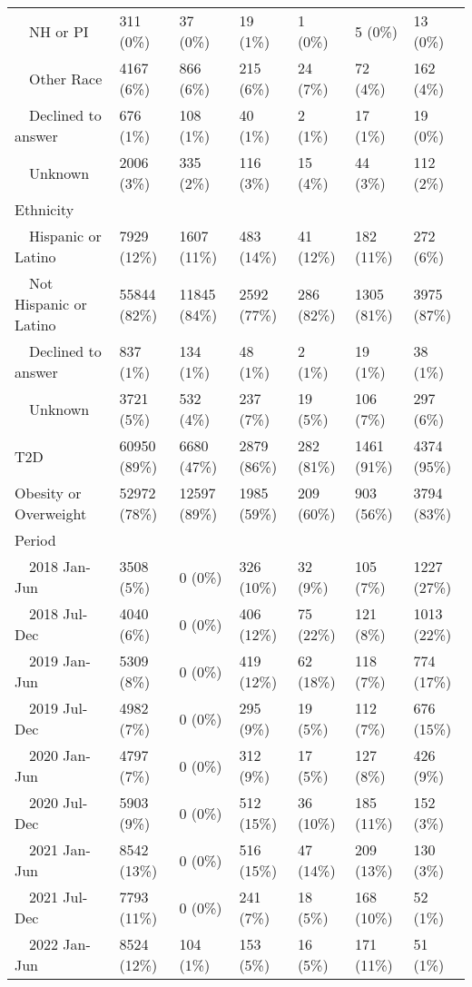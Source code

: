 \begin{longtable}{p{}p{}p{}p{}p{}p{}p{}}
    NH or PI & 311 (0\%) & 37 (0\%) & 19 (1\%) & 1 (0\%) & 5 (0\%) & 13 (0\%) \\ 
    Other Race & 4167 (6\%) & 866 (6\%) & 215 (6\%) & 24 (7\%) & 72 (4\%) & 162 (4\%) \\ 
    Declined to answer & 676 (1\%) & 108 (1\%) & 40 (1\%) & 2 (1\%) & 17 (1\%) & 19 (0\%) \\ 
    Unknown & 2006 (3\%) & 335 (2\%) & 116 (3\%) & 15 (4\%) & 44 (3\%) & 112 (2\%) \\ 
  Ethnicity &  &  &  &  &  &  \\ 
    Hispanic or Latino & 7929 (12\%) & 1607 (11\%) & 483 (14\%) & 41 (12\%) & 182 (11\%) & 272 (6\%) \\ 
    Not Hispanic or Latino & 55844 (82\%) & 11845 (84\%) & 2592 (77\%) & 286 (82\%) & 1305 (81\%) & 3975 (87\%) \\ 
    Declined to answer & 837 (1\%) & 134 (1\%) & 48 (1\%) & 2 (1\%) & 19 (1\%) & 38 (1\%) \\ 
    Unknown & 3721 (5\%) & 532 (4\%) & 237 (7\%) & 19 (5\%) & 106 (7\%) & 297 (6\%) \\ 
  T2D & 60950 (89\%) & 6680 (47\%) & 2879 (86\%) & 282 (81\%) & 1461 (91\%) & 4374 (95\%) \\ 
  Obesity or Overweight & 52972 (78\%) & 12597 (89\%) & 1985 (59\%) & 209 (60\%) & 903 (56\%) & 3794 (83\%) \\ 
  Period &  &  &  &  &  &  \\ 
    2018 Jan-Jun & 3508 (5\%) & 0 (0\%) & 326 (10\%) & 32 (9\%) & 105 (7\%) & 1227 (27\%) \\ 
    2018 Jul-Dec & 4040 (6\%) & 0 (0\%) & 406 (12\%) & 75 (22\%) & 121 (8\%) & 1013 (22\%) \\ 
    2019 Jan-Jun & 5309 (8\%) & 0 (0\%) & 419 (12\%) & 62 (18\%) & 118 (7\%) & 774 (17\%) \\ 
    2019 Jul-Dec & 4982 (7\%) & 0 (0\%) & 295 (9\%) & 19 (5\%) & 112 (7\%) & 676 (15\%) \\ 
    2020 Jan-Jun & 4797 (7\%) & 0 (0\%) & 312 (9\%) & 17 (5\%) & 127 (8\%) & 426 (9\%) \\ 
    2020 Jul-Dec & 5903 (9\%) & 0 (0\%) & 512 (15\%) & 36 (10\%) & 185 (11\%) & 152 (3\%) \\ 
    2021 Jan-Jun & 8542 (13\%) & 0 (0\%) & 516 (15\%) & 47 (14\%) & 209 (13\%) & 130 (3\%) \\ 
    2021 Jul-Dec & 7793 (11\%) & 0 (0\%) & 241 (7\%) & 18 (5\%) & 168 (10\%) & 52 (1\%) \\ 
    2022 Jan-Jun & 8524 (12\%) & 104 (1\%) & 153 (5\%) & 16 (5\%) & 171 (11\%) & 51 (1\%) \\ 

\end{longtable}

